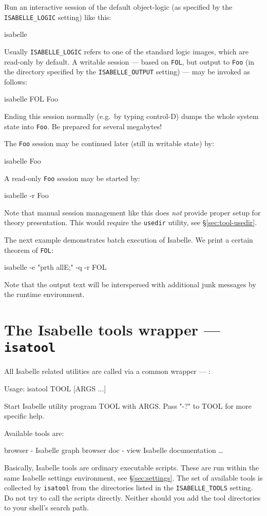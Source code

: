 Run an interactive session of the default object-logic (as specified
by the \texttt{ISABELLE_LOGIC} setting) like this:
\begin{ttbox}
isabelle
\end{ttbox}
Usually \texttt{ISABELLE_LOGIC} refers to one of the standard logic
images, which are read-only by default.  A writable session --- based
on \texttt{FOL}, but output to \texttt{Foo} (in the directory
specified by the \texttt{ISABELLE_OUTPUT} setting) --- may be invoked
as follows:
\begin{ttbox}
isabelle FOL Foo
\end{ttbox}
Ending this session normally (e.g.\ by typing control-D) dumps the
whole {\ML} system state into \texttt{Foo}. Be prepared for several
megabytes!

The \texttt{Foo} session may be continued later (still in writable
state) by:
\begin{ttbox}
isabelle Foo
\end{ttbox}
A read-only \texttt{Foo} session may be started by:
\begin{ttbox}
isabelle -r Foo
\end{ttbox}

\medskip Note that manual session management like this does \emph{not} provide
proper setup for theory presentation.  This would require the \texttt{usedir}
utility, see \S\ref{sec:tool-usedir}.

\bigskip The next example demonstrates batch execution of Isabelle. We print a
certain theorem of \texttt{FOL}:
\begin{ttbox}
isabelle -e "prth allE;" -q -r FOL
\end{ttbox}
Note that the output text will be interspersed with additional junk messages
by the {\ML} runtime environment.


\section{The Isabelle tools wrapper --- \texttt{isatool}} \label{sec:isatool}

All Isabelle related utilities are called via a common wrapper ---
:
\begin{ttbox}
Usage: isatool TOOL [ARGS ...]

  Start Isabelle utility program TOOL with ARGS. Pass "-?" to TOOL
  for more specific help.

  Available tools are:

    browser - Isabelle graph browser
    doc - view Isabelle documentation
    \dots
\end{ttbox}
Basically, Isabelle tools are ordinary executable scripts.  These are run
within the same Isabelle settings environment, see \S\ref{sec:settings}.  The
set of available tools is collected by \texttt{isatool} from the directories
listed in the \texttt{ISABELLE_TOOLS} setting.  Do not try to call the scripts
directly.  Neither should you add the tool directories to your shell's search
path.


